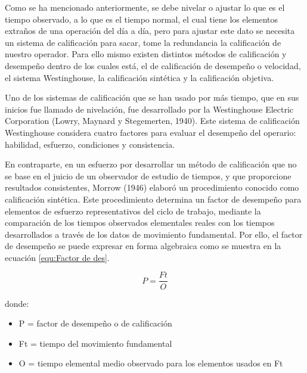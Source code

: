     
    Como se ha mencionado anteriormente, se debe nivelar o ajustar lo que es el tiempo observado, a lo que es el tiempo normal, el cual tiene los elementos extraños de una operación del día a día, pero para ajustar este dato se necesita un sistema de calificación para sacar, tome la redundancia la calificación de nuestro operador. Para ello mismo existen distintos métodos de calificación y desempeño dentro de los cuales está, el de calificación de desempeño o velocidad, el sistema Westinghouse, la calificación sintética y la calificación objetiva.\cite{niebel1980ingenieria}
    
    
    
    
    Uno de los sistemas de calificación que se han usado por más tiempo, que en sus inicios fue llamado de nivelación, fue desarrollado por la Westinghouse Electric Corporation (Lowry, Maynard y Stegemerten, 1940). Este sistema de calificación Westinghouse considera cuatro factores para evaluar el desempeño del operario: habilidad, esfuerzo, condiciones y consistencia.\cite{niebel1980ingenieria}
    
    En contraparte, en un esfuerzo por desarrollar un método de calificación que no se base en el juicio de un observador de estudio de tiempos, y que proporcione resultados consistentes, Morrow (1946) elaboró un procedimiento conocido como calificación sintética. Este procedimiento determina un factor de desempeño para elementos de esfuerzo representativos del ciclo de trabajo, mediante la comparación de los tiempos observados elementales reales con los tiempos desarrollados a través de los datos de movimiento fundamental. Por ello, el factor de desempeño se puede expresar en forma algebraica como se muestra en la ecuación \ref{equ:Factor de des}. \cite{niebel1980ingenieria}
    
    
    \begin{equation}
        \label{equ:Factor de des}
       P= \frac{Ft}{O}
    \end{equation}
    
    donde: 
    \begin{itemize}
        \item P =  factor de desempeño o de calificación
        \item Ft = tiempo del movimiento fundamental
        \item O =  tiempo elemental medio observado para los elementos usados en Ft
    \end{itemize}
    
